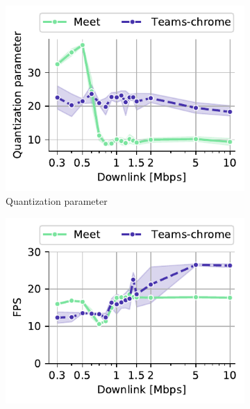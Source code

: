 
\begin{figure}[]
    \begin{subfigure}[t]{0.3\textwidth}      
    		\centering
        \includegraphics[width=\textwidth,keepaspectratio]{figures/static/downlink_r_qpsum.pdf}
        \vspace{-2em}
        \caption{Quantization parameter}
 		\label{subfig:downlink_video_bitrate}
    \end{subfigure}%
    \hfill
	\begin{subfigure}[t]{0.3\textwidth}   
        \centering
        \includegraphics[width=\textwidth]{figures/static/downlink_received_framesPerSecond.pdf}

\end{subfigure}
\end{figure}
